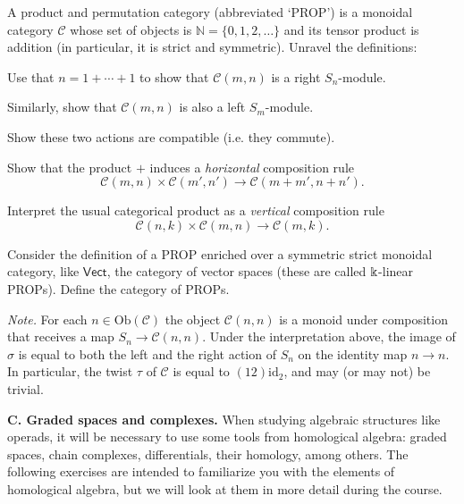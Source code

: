 \begin{question} A product and permutation category (abbreviated `PROP')
is a monoidal category $\mathcal{C}$ whose set of objects is $\mathbb N = 
\{0,1,2,\ldots\}$ and its tensor product is addition (in particular, it is strict and symmetric). Unravel the definitions:
\begin{tenumerate}
\item Use that $n = 1+\cdots + 1$ to show that $\mathcal{C}(m,n)$ is a right $S_n$-module.
\item Similarly, show that $\mathcal{C}(m,n)$ is also a left $S_m$-module.
\item Show these two actions are compatible (i.e. they commute).
\item Show that the product $+$ induces a \emph{horizontal} composition rule 
\[ \mathcal{C}(m,n) \times \mathcal{C}(m',n') 	\longrightarrow
 	\mathcal{C}(m+m',n+n'). \]
\item Interpret the usual categorical product as a \emph{vertical} composition rule 
\[ \mathcal{C}(n,k) \times \mathcal{C}(m,n) 	\longrightarrow
 	\mathcal{C}(m,k). \]
\end{tenumerate}
Consider the definition of a PROP enriched over a symmetric strict 
monoidal category, like $\mathsf{Vect}$, the category of vector spaces (these are called $\Bbbk$-linear
PROPs). Define the category of PROPs. 
\end{question}

\emph{Note.} For 
each $n\in\mathrm{Ob}(\mathcal C)$ the
object $\mathcal{C}(n,n)$ is a monoid under composition
 that receives a map $S_n\longrightarrow \mathcal{C}(n,n)$.
 Under the interpretation above, the image of $\sigma$
  is equal to both the left and the right action of $S_n$ 
  on the identity map $n\to n$. In particular, the twist
  $\tau$ of $\mathcal{C}$ is equal to $(12)\mathrm{id}_2$,
  and may (or may not) be trivial.
  
  \medskip
  
\textbf{C. Graded spaces and complexes.} When studying
algebraic structures like operads, it will be necessary
to use some tools from homological algebra: graded spaces,
chain complexes, differentials, their homology, among
others. The following exercises are intended to familiarize
you with the elements of homological algebra, but we will
look at them in more detail during the course.

